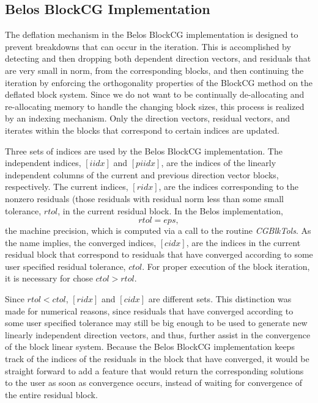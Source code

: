 \documentclass{article}
\newcommand{\dm}{\begin{displaymath}}
\newcommand{\edm}{\end{displaymath}}
\begin{document}
\subsection{Belos BlockCG Implementation}
\label{sec:belosblkcg}

The deflation mechanism in the Belos BlockCG implementation is
designed to prevent breakdowns that can occur in the iteration.
This is accomplished by detecting and then dropping both dependent
direction vectors, and residuals that are very small in norm, from
the corresponding blocks, and then continuing the iteration by
enforcing the orthogonality properties of the BlockCG method on
the deflated block system. Since we do not want to be continually
de-allocating and re-allocating memory to handle the changing
block sizes, this process is realized by an indexing mechanism.
Only the direction vectors, residual vectors, and iterates within
the blocks that correspond to certain indices are updated.

Three sets of indices are used by the Belos BlockCG
implementation. The independent indices, $[iidx]$ and $[piidx]$,
are the indices of the linearly independent columns of the current
and previous direction vector blocks, respectively. The current
indices, $[ridx]$, are the indices corresponding to the nonzero
residuals (those residuals with residual norm less than some small
tolerance, $rtol$, in the current residual block. In the Belos
implementation,
 \dm
 rtol = eps,
 \edm
the machine precision, which is computed via a call to the routine
{\it CGBlkTols}.  As the name implies, the converged indices,
$[cidx]$, are the indices in the current residual block that
correspond to residuals that have converged according to some user
specified residual tolerance, $ctol$. For proper execution of the
block iteration, it is necessary for chose $ctol > rtol$.

Since $rtol < ctol$, $[ridx]$ and $[cidx]$ are different sets.
This distinction was made for numerical reasons, since residuals
that have converged according to some user specified tolerance may
still be big enough to be used to generate new linearly
independent direction vectors, and thus, further assist in the
convergence of the block linear system. Because the Belos BlockCG
implementation keeps track of the indices of the residuals in the
block that have converged, it would be straight forward to add a
feature that would return the corresponding solutions to the user
as soon as convergence occurs, instead of waiting for convergence
of the entire residual block.
\end{document}
